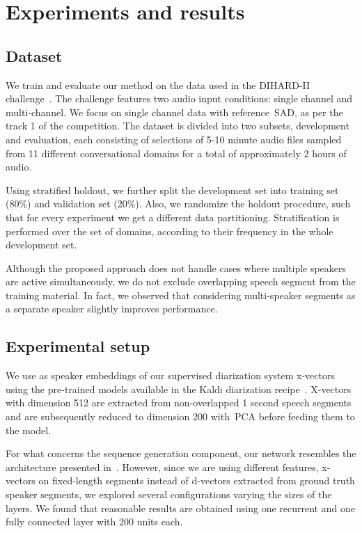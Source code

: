 \documentclass{article}
\begin{document}
\section{Experiments and results}
\label{sec:experiments}

\subsection{Dataset}
\label{sec:dataset}
We train and evaluate our method on the data used in the DIHARD-II challenge~\cite{Ryant2019}. The challenge features two audio input conditions: single channel and multi-channel. We focus on single channel data with reference~\ac{SAD}, as per the track 1 of the competition. The dataset is divided into two subsets, development and evaluation, each consisting of selections of 5-10 minute audio files sampled from 11 different conversational domains for a total of approximately 2 hours of audio.

Using stratified holdout, we further split the development set into training set (80\%) and validation set (20\%). Also, we randomize the holdout procedure, such that for every experiment we get a different data partitioning. Stratification is performed over the set of domains, according to their frequency in the whole development set.

Although the proposed approach does not handle cases where multiple speakers are active simultaneously, we do not exclude overlapping speech segment from the training material. In fact, we observed that considering multi-speaker segments as a separate speaker slightly improves performance. 

\subsection{Experimental setup}
\label{sec:setup}
We use as speaker embeddings of our supervised diarization system x-vectors~\cite{Sell2018} using the pre-trained models available in the Kaldi diarization recipe~\cite{Povey_ASRU2011}. X-vectors with dimension 512 are extracted from non-overlapped 1 second speech segments and are subsequently reduced to dimension 200 with~\ac{PCA} before feeding them to the model.

For what concerns the sequence generation component, our network resembles the architecture presented in~\cite{zhang2019fully}. However, since we are using different features, x-vectors on fixed-length segments instead of d-vectors extracted from ground truth speaker segments, we explored several configurations varying the sizes of the layers. We found that reasonable results are obtained using one recurrent and one fully connected layer with 200 units each.
\end{document}
